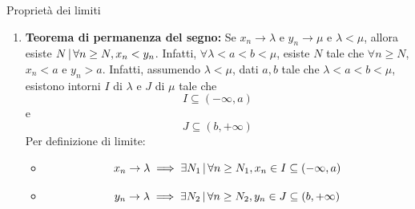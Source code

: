\documentclass[a4paper]{article}
\begin{document}
\begin{snippetproposition}{Proprietà dei limiti}
    \begin{enumerate}
        \item \textbf{Teorema di permanenza del segno:} Se \(x_n \to \lambda\) e \(y_n \to \mu\) e \(\lambda < \mu\), allora esiste
        \(N \,|\, \forall n \geq N, x_n < y_n\). %
        Infatti, \(\forall \lambda < a < b < \mu\),
        esiste \(N\) tale che \(\forall n \geq N\), \(x_n < a\) e \(y_n > a\).
        Infatti, assumendo \(\lambda < \mu\), dati \(a,b\) tale che \(\lambda < a < b < \mu\),
        esistono intorni \(I\) di \(\lambda\) e \(J\) di \(\mu\) tale che
        \[
            I \subseteq (-\infty, a)
        \]
        e
        \[
            J \subseteq (b, +\infty)
        \]
        Per definizione di limite:
        \begin{itemize}
            \item \[x_n \to \lambda \implies \exists N_1 \,|\, \forall n \geq N_1, x_n \in I \subseteq (-\infty, a)\]
            \item \[y_n \to \lambda \implies \exists N_2 \,|\, \forall n \geq N_2, y_n \in J \subseteq (b, +\infty)\]
        \end{itemize}

\end{enumerate}
\end{snippetproposition}
\end{document}
